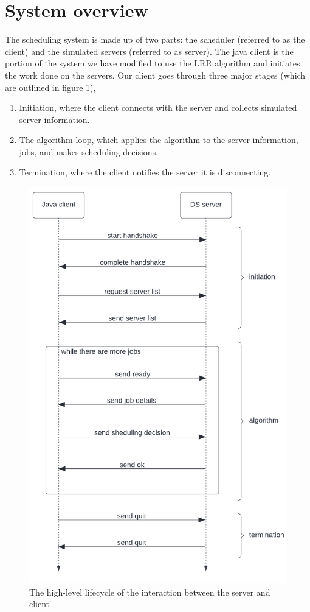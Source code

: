 \documentclass[a4paper]{article} %
\begin{document}
\section{System overview}
\label{sec:section2}

The scheduling system is made up of two parts: the scheduler (referred to as the client) and the simulated servers (referred to as server). The java client is the portion of the system we have modified to use the LRR algorithm and initiates the work done on the servers. Our client goes through three major stages (which are outlined in figure 1), \begin{enumerate}
    \item Initiation, where the client connects with the server and collects simulated server information.
    \item The algorithm loop, which applies the algorithm to the server information, jobs, and makes scheduling decisions.
    \item Termination, where the client notifies the server it is disconnecting.
\end{enumerate}
\begin{figure}
    \centering
    \includegraphics{over.png}
    \caption{The high-level lifecycle of the interaction between the server and client}
    \label{fig:overview}
\end{figure}
\end{document}
